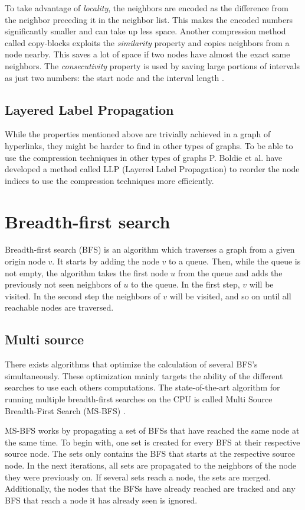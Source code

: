 To take advantage of \emph{locality}, the neighbors are encoded as the difference from the neighbor preceding it in the neighbor list. This makes the encoded numbers significantly smaller and can take up less space. Another compression method called copy-blocks exploits the \emph{similarity} property and copies neighbors from a node nearby. This saves a lot of space if two nodes have almost the exact same neighbors. The \emph{consecutivity} property is used by saving large portions of intervals as just two numbers: the start node and the interval length \cite{webgraph-compression}. 


\subsection{Layered Label Propagation}

While the properties mentioned above are trivially achieved in a graph of hyperlinks, they might be harder to find in other types of graphs. To be able to use the compression techniques in other types of graphs P. Boldie et al. have developed a method called LLP (Layered Label Propagation) \cite{llp} to reorder the node indices to use the compression techniques more efficiently. 

\section{Breadth-first search}
Breadth-first search (BFS) is an algorithm which traverses a graph from a given origin node $v$. It starts by adding the node $v$ to a queue. Then, while the queue is not empty, the algorithm takes the first node $u$ from the queue and adds the previously not seen neighbors of $u$ to the queue. In the first step, $v$ will be visited. In the second step the neighbors of $v$ will be visited, and so on until all reachable nodes are traversed.

\subsection{Multi source}
There exists algorithms that optimize the calculation of several BFS's simultaneously. These optimization mainly targets the ability of the different searches to use each others computations. The state-of-the-art algorithm for running multiple breadth-first searches on the CPU is called Multi Source Breadth-First Search (MS-BFS) \cite{msbfs}.

MS-BFS works by propagating a set of BFSs that have reached the same node at the same time. To begin with, one set is created for every BFS at their respective source node. The sets only contains the BFS that starts at the respective source node. In the next iterations, all sets are propagated to the neighbors of the node they were previously on. If several sets reach a node, the sets are merged. Additionally, the nodes that the BFSs have already reached are tracked and any BFS that reach a node it has already seen is ignored. 

